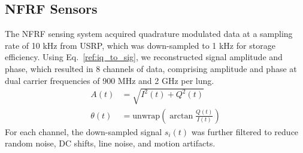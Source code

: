 \documentclass[journal]{IEEEtran}
\begin{document}
\subsection{NFRF Sensors}
The NFRF sensing system acquired quadrature modulated data at a sampling rate of 10 kHz from USRP, which was down-sampled to 1 kHz for storage efficiency. Using Eq.~\ref{ref:iq_to_sig}, we reconstructed signal amplitude and phase, which resulted in 8 channels of data, comprising amplitude and phase at dual carrier frequencies of 900 MHz and 2 GHz per lung. 
\begin{equation}
    \begin{split}
        A(t) &= \sqrt{I^2(t) + Q^2(t)} \\
        \theta (t) &= \text{unwrap}(\arctan \frac{Q(t)}{I(t)})
    \end{split}
    \label{ref:iq_to_sig}    
\end{equation}
For each channel, the down-sampled signal $s_{i}(t)$ was further filtered to reduce random noise, DC shifts, line noise, and motion artifacts. 
\end{document}
